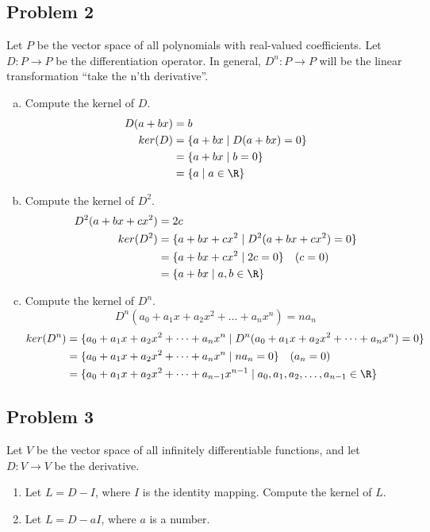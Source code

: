 \documentclass{math}
\begin{document}
\subsection*{Problem 2}
Let \( P \) be the vector space of all polynomials with real-valued
coefficients. Let \( D:P\to P \) be the differentiation operator. In general,
\( D^n:P\to P \) will be the linear transformation ``take the n'th derivative''.
\begin{enumerate}[(a)]
  \item Compute the kernel of \( D \).
  \begin{align*}
    D(a+bx) &= b \\
    ker(D) &= \{a+bx\mid D(a+bx) = 0\} \\
    &= \{a+bx\mid b = 0\} \\
    &= \{a\mid a\in\R\}
  \end{align*}
  \item Compute the kernel of \( D^2 \).
  \begin{align*}
    D^2(a+bx+cx^2) &= 2c \\
    ker(D^2) &= \{a+bx+cx^2\mid D^2(a+bx+cx^2) = 0\} \\
    &= \{a+bx+cx^2\mid 2c = 0\} \quad (c = 0) \\
    &= \{a+bx\mid a,b\in\R\}
  \end{align*}
  \item Compute the kernel of \( D^n \).
  \[ D^n(a_0+a_1x+a_2x^2+\dots+a_nx^n) = na_n \]
  \begin{align*}
    ker(D^n) &= \{a_0+a_1x+a_2x^2+\dots+a_nx^n\mid
      D^n(a_0+a_1x+a_2x^2+\dots+a_nx^n) = 0\} \\
    &= \{a_0+a_1x+a_2x^2+\dots+a_nx^n\mid na_n = 0\} \quad (a_n = 0) \\
    &= \{a_0+a_1x+a_2x^2+\dots+a_{n-1}x^{n-1}\mid
      a_0,a_1,a_2,\dots,a_{n-1}\in\R\} \\
  \end{align*}
\end{enumerate}

\subsection*{Problem 3}
Let \( V \) be the vector space of all infinitely differentiable functions, and
let \( D:V\to V \) be the derivative.
\begin{enumerate}
  \item Let \( L = D-I \), where \( I \) is the identity mapping. Compute the
  kernel of \( L \).
  \item Let \( L = D-aI \), where \( a \) is a number.
\end{enumerate}
\end{document}
